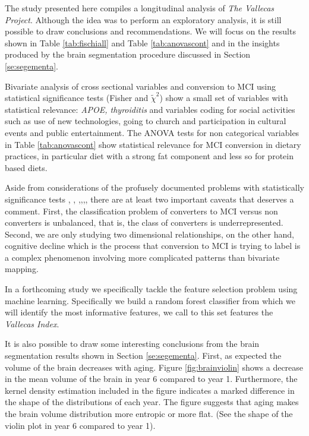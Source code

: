 \documentclass[11pt]{article}
\theoremstyle{definition}
\theoremstyle{remark}
\begin{document}

The study presented here compiles a longitudinal analysis of \emph{The Vallecas Project}. Although the idea was to perform an exploratory analysis, it is still possible to draw conclusions and recommendations.
We will focus on the results shown in Table \ref{tab:fischiall} and Table \ref{tab:anovascont} and in the insights produced by the brain segmentation procedure discussed in Section \ref{se:segementa}.

Bivariate analysis of cross sectional variables and conversion to MCI using statistical significance tests (Fisher and $\tilde{\chi}^2$) show a small set of variables with statistical relevance: \emph{APOE, thyroiditis} and variables coding for social activities such as use of new technologies, going to church and participation in cultural events and public entertainment.
The ANOVA tests for non categorical variables in Table \ref{tab:anovascont} show statistical relevance for MCI conversion in dietary practices, in particular diet with a strong fat component and less so for protein based diets.

Aside from considerations of the profusely documented problems with statistically significance tests \cite{ioannidis2005most}, \cite{simmons2011false}, \cite{veresoglou2015p},\cite{greenland2016statistical},\cite{stupple2019reproducibility},\cite{hurlbert2019coup},  there are at least two important caveats that deserves a comment. First, the classification problem of converters to MCI versus non converters is unbalanced, that is, the class of converters is underrepresented. Second, we are only studying two dimensional relationships, on the other hand, cognitive decline which is the process that conversion to MCI is trying to label is a complex phenomenon involving more complicated patterns than bivariate mapping. 

In a forthcoming study we specifically tackle the feature selection problem using machine learning. Specifically we build a random forest classifier \cite{breiman2001random} from which we will identify the most informative features, we call to this set features the \emph{Vallecas Index}.

It is also possible to draw some interesting conclusions from the brain segmentation results shown in Section \ref{se:segementa}. First, as expected the volume of the brain decreases with aging. Figure \ref{fig:brainviolin} shows a decrease in the mean volume of the brain in year 6 compared to year 1. Furthermore, the kernel density estimation included in the figure indicates a marked difference in the shape of the distributions of each year. The figure suggests that aging makes the brain volume distribution more entropic or more flat. (See the shape of the violin plot in year 6 compared to year 1).
\end{document}
